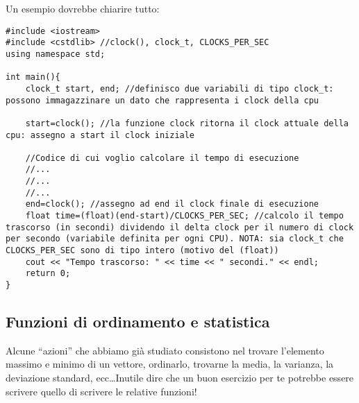 Un esempio dovrebbe chiarire tutto:
\begin{lstlisting}
#include <iostream> 
#include <cstdlib> //clock(), clock_t, CLOCKS_PER_SEC
using namespace std;

int main(){
	clock_t start, end; //definisco due variabili di tipo clock_t: possono immagazzinare un dato che rappresenta i clock della cpu
	
	start=clock(); //la funzione clock ritorna il clock attuale della cpu: assegno a start il clock iniziale
	
	//Codice di cui voglio calcolare il tempo di esecuzione
	//...
	//...
	//...
	end=clock(); //assegno ad end il clock finale di esecuzione
	float time=(float)(end-start)/CLOCKS_PER_SEC; //calcolo il tempo trascorso (in secondi) dividendo il delta clock per il numero di clock per secondo (variabile definita per ogni CPU). NOTA: sia clock_t che CLOCKS_PER_SEC sono di tipo intero (motivo del (float))
	cout << "Tempo trascorso: " << time << " secondi." << endl; 
	return 0;
}
\end{lstlisting}

\subsection{Funzioni di ordinamento e statistica}
Alcune ``azioni'' che abbiamo già studiato consistono nel trovare l'elemento massimo e minimo di un vettore, ordinarlo, trovarne la media, la varianza, la deviazione standard, ecc\ldots Inutile dire che un buon esercizio per te potrebbe essere scrivere quello di scrivere le relative funzioni!\\

